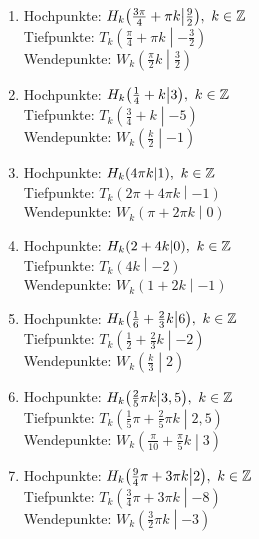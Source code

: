 \begin{Answer}[ref=sincosExtremWendeA1]
	\begin{enumerate}[label=\alph*)]
		\item Hochpunkte: \(H_k\left(\frac{3\pi}{4}+\pi k \middle\vert\frac{9}{2} \right),\ k\in\Z\)\\
		Tiefpunkte: \(T_k\left(\frac{\pi}{4}+\pi k \middle\vert-\frac{3}{2} \right)\)\\
		Wendepunkte: \(W_k\left(\frac{\pi}{2}k \middle\vert\frac{3}{2} \right)\)
		\item Hochpunkte: \(H_k\left(\frac{1}{4}+k \middle\vert 3 \right),\ k\in\Z\)\\
		Tiefpunkte: \(T_k\left(\frac{3}{4}+k \middle\vert -5 \right)\)\\
		Wendepunkte: \(W_k\left(\frac{k}{2} \middle\vert-1 \right)\)
		\item Hochpunkte: \(H_k\left(4\pi k \middle\vert1 \right),\ k\in\Z\)\\
		Tiefpunkte: \(T_k\left(2\pi+4\pi k \middle\vert-1 \right)\)\\
		Wendepunkte: \(W_k\left(\pi+2\pi k \middle\vert0 \right)\)
		\item Hochpunkte: \(H_k\left(2+4k \middle\vert 0\right),\ k\in\Z\)\\
		Tiefpunkte: \(T_k\left(4k \middle\vert-2 \right)\)\\
		Wendepunkte: \(W_k\left(1+2k \middle\vert-1 \right)\)
		\item Hochpunkte: \(H_k\left(\frac{1}{6}+\frac{2}{3}k \middle\vert6 \right),\ k\in\Z\)\\
		Tiefpunkte: \(T_k\left(\frac{1}{2}+\frac{2}{3}k \middle\vert-2 \right)\)\\
		Wendepunkte: \(W_k\left(\frac{k}{3} \middle\vert2 \right)\)
		\item Hochpunkte: \(H_k\left(\frac{2}{5}\pi k \middle\vert3,5 \right),\ k\in\Z\)\\
		Tiefpunkte: \(T_k\left(\frac{1}{5}\pi+\frac{2}{5}\pi k \middle\vert2,5 \right)\)\\
		Wendepunkte: \(W_k\left(\frac{\pi}{10}+\frac{\pi}{5}k \middle\vert3 \right)\)
		\item Hochpunkte: \(H_k\left(\frac{9}{4}\pi+3\pi k \middle\vert 2\right),\ k\in\Z\)\\
		Tiefpunkte: \(T_k\left(\frac{3}{4}\pi+3\pi k \middle\vert -8\right)\)\\
		Wendepunkte: \(W_k\left(\frac{3}{2}\pi k \middle\vert-3 \right)\)

\end{enumerate}
\end{Answer}
